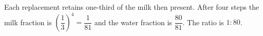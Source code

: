 Each replacement retains one-third of the milk then present. After four steps the milk fraction is $(\dfrac{1}{3})^4=\dfrac{1}{81}$ and the water fraction is $\dfrac{80}{81}$. The ratio is $\boxed{1:80}$.
